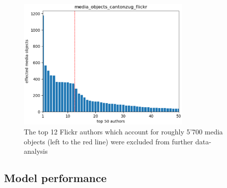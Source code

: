 \begin{figure}[ht]
   \centering
   \includegraphics[width=0.75\textwidth]{img/cantonzug_flickr_top50_w_line.eps}
   \caption{The top 12 Flickr authors which account for roughly 5\rq700 media objects (left to the red line) were excluded from further data-analysis}
   \label{img:dominant_users_flickr}
\end{figure}



\subsection{Model performance}

